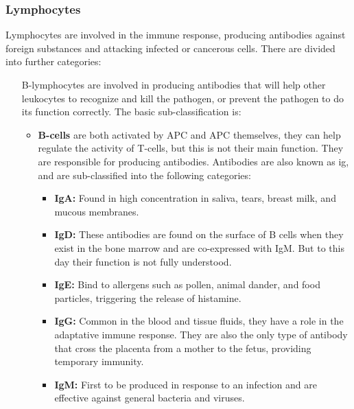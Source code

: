 \subsubsection{Lymphocytes}

Lymphocytes are involved in the immune response, producing antibodies against foreign substances and attacking infected or cancerous cells. There are divided into further categories:

    \begin{itemize}

        \item[B-lymphocytes] are involved in producing antibodies that will help other leukocytes to recognize and kill the pathogen, or prevent the pathogen to do its function correctly. The basic sub-classification is:

        \begin{itemize}

            \item{\textbf{B-cells}} are both activated by APC and APC themselves, they can help regulate the activity of T-cells, but this is not their main function. They are responsible for producing antibodies. Antibodies are also known as \gls{ig}, and are sub-classified into the following categories:
    
                \begin{itemize}
        
                    \item{\textbf{IgA:}} Found in high concentration in saliva, tears, breast milk, and mucous membranes.
            
                    \item{\textbf{IgD:}} These antibodies are found on the surface of B cells when they exist in the bone marrow and are co-expressed with IgM. But to this day their function is not fully understood.
            
                    \item{\textbf{IgE:}} Bind to allergens such as pollen, animal dander, and food particles, triggering the release of histamine.
            
                    \item{\textbf{IgG:}} Common in the blood and tissue fluids, they have a role in the adaptative immune response. They are also the only type of antibody that cross the placenta from a mother to the fetus, providing temporary immunity.
            
                    \item{\textbf{IgM:}} First to be produced in response to an infection and are effective against general bacteria and viruses.
                

\end{itemize}
\end{itemize}
\end{itemize}
